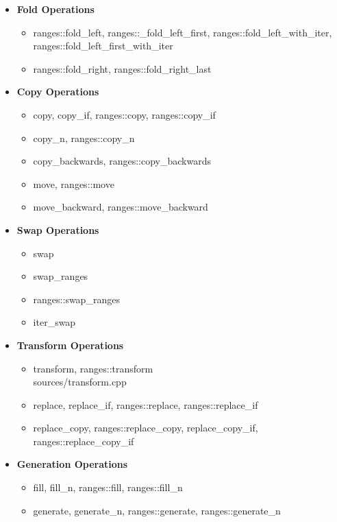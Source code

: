 \documentclass{article}
\begin{document}
\begin{itemize}
        \item \textbf{Fold Operations}
          \begin{itemize}
            \item ranges::fold\_left, ranges::\_fold\_left\_first, ranges::fold\_left\_with\_iter, ranges::fold\_left\_first\_with\_iter
            \item ranges::fold\_right, ranges::fold\_right\_last
          \end{itemize}
        \item \textbf{Copy Operations}
          \begin{itemize}
            \item copy, copy\_if, ranges::copy, ranges::copy\_if
            \item copy\_n, ranges::copy\_n
            \item copy\_backwards, ranges::copy\_backwards
            \item move, ranges::move
            \item move\_backward, ranges::move\_backward
          \end{itemize}
        \item \textbf{Swap Operations}
          \begin{itemize}
            \item swap
            \item swap\_ranges
            \item ranges::swap\_ranges
            \item iter\_swap
          \end{itemize}
        \item \textbf{Transform Operations}
          \begin{itemize}
            \item transform, ranges::transform \\
               {sources/transform.cpp}
            \item replace, replace\_if, ranges::replace, ranges::replace\_if
            \item replace\_copy, ranges::replace\_copy, replace\_copy\_if, ranges::replace\_copy\_if
          \end{itemize}
        \item \textbf{Generation Operations}
          \begin{itemize}
            \item fill, fill\_n, ranges::fill, ranges::fill\_n
            \item generate, generate\_n, ranges::generate, ranges::generate\_n

\end{itemize}
\end{itemize}
\end{document}
